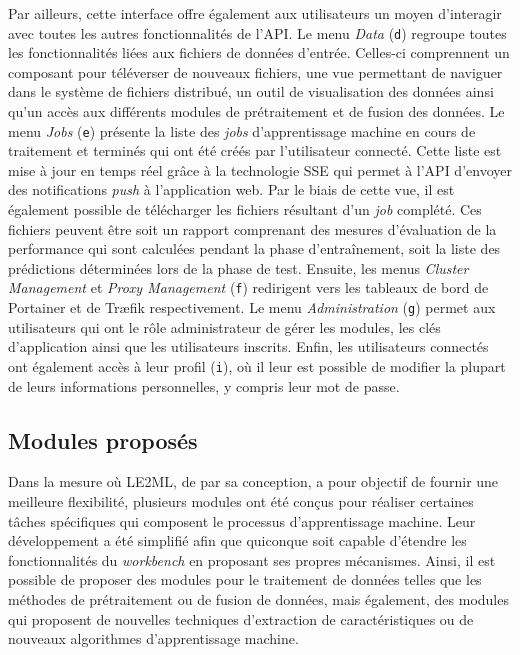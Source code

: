 Par ailleurs, cette interface offre également aux utilisateurs un moyen d'interagir avec toutes les autres fonctionnalités de l'\acs{API}. Le menu \textit{Data} (\texttt{d}) regroupe toutes les fonctionnalités liées aux fichiers de données d'entrée. Celles-ci comprennent un composant pour téléverser de nouveaux fichiers, une vue permettant de naviguer dans le système de fichiers distribué, un outil de visualisation des données ainsi qu'un accès aux différents modules de prétraitement et de fusion des données. Le menu \textit{Jobs} (\texttt{e}) présente la liste des \textit{jobs} d'apprentissage machine en cours de traitement et terminés qui ont été créés par l'utilisateur connecté. Cette liste est mise à jour en temps réel grâce à la technologie \ac{SSE} qui permet à l'\acs{API} d'envoyer des notifications \textit{push} à l'application web. Par le biais de cette vue, il est également possible de télécharger les fichiers résultant d'un \textit{job} complété. Ces fichiers peuvent être soit un rapport comprenant des mesures d'évaluation de la performance qui sont calculées pendant la phase d'entraînement, soit la liste des prédictions déterminées lors de la phase de test. Ensuite, les menus \textit{Cluster Management} et \textit{Proxy Management} (\texttt{f}) redirigent vers les tableaux de bord de Portainer et de Tr\ae{}fik respectivement. Le menu \textit{Administration} (\texttt{g}) permet aux utilisateurs qui ont le rôle administrateur de gérer les modules, les clés d'application ainsi que les utilisateurs inscrits. Enfin, les utilisateurs connectés ont également accès à leur profil (\texttt{i}), où il leur est possible de modifier la plupart de leurs informations personnelles, y compris leur mot de passe.

\subsection{Modules proposés}

Dans la mesure où \acs{LE2ML}, de par sa conception, a pour objectif de fournir une meilleure flexibilité, plusieurs modules ont été conçus pour réaliser certaines tâches spécifiques qui composent le processus d'apprentissage machine. Leur développement a été simplifié afin que quiconque soit capable d'étendre les fonctionnalités du \textit{workbench} en proposant ses propres mécanismes. Ainsi, il est possible de proposer des modules pour le traitement de données telles que les méthodes de prétraitement ou de fusion de données, mais également, des modules qui proposent de nouvelles techniques d'extraction de caractéristiques ou de nouveaux algorithmes d'apprentissage machine.

